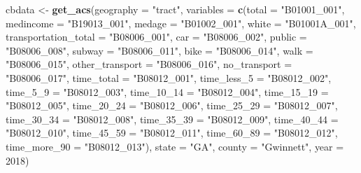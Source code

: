 \documentclass[
]{article}
\newenvironment{Shaded}{\begin{snugshade}}{\end{snugshade}}
\newcommand{\DataTypeTok}[1]{\textcolor[rgb]{0.13,0.29,0.53}{#1}}
\newcommand{\DecValTok}[1]{\textcolor[rgb]{0.00,0.00,0.81}{#1}}
\newcommand{\KeywordTok}[1]{\textcolor[rgb]{0.13,0.29,0.53}{\textbf{#1}}}
\newcommand{\NormalTok}[1]{#1}
\newcommand{\StringTok}[1]{\textcolor[rgb]{0.31,0.60,0.02}{#1}}
\begin{document}
\begin{Shaded}
\begin{Highlighting}[]
\NormalTok{cbdata <-}\StringTok{ }\KeywordTok{get_acs}\NormalTok{(}\DataTypeTok{geography =} \StringTok{"tract"}\NormalTok{,}
                  \DataTypeTok{variables =} \KeywordTok{c}\NormalTok{(}\DataTypeTok{total =} \StringTok{"B01001_001"}\NormalTok{,}
                                \DataTypeTok{medincome =} \StringTok{"B19013_001"}\NormalTok{,}
                                \DataTypeTok{medage =} \StringTok{"B01002_001"}\NormalTok{,}
                                \DataTypeTok{white =} \StringTok{"B01001A_001"}\NormalTok{,}
                                \DataTypeTok{transportation_total =} \StringTok{"B08006_001"}\NormalTok{,}
                                \DataTypeTok{car =} \StringTok{"B08006_002"}\NormalTok{,}
                                \DataTypeTok{public =} \StringTok{"B08006_008"}\NormalTok{,}
                                \DataTypeTok{subway =} \StringTok{"B08006_011"}\NormalTok{,}
                                \DataTypeTok{bike =} \StringTok{"B08006_014"}\NormalTok{,}
                                \DataTypeTok{walk =} \StringTok{"B08006_015"}\NormalTok{,}
                                \DataTypeTok{other_transport =} \StringTok{"B08006_016"}\NormalTok{,}
                                \DataTypeTok{no_transport =} \StringTok{"B08006_017"}\NormalTok{,}
                                \DataTypeTok{time_total =} \StringTok{"B08012_001"}\NormalTok{,}
                                \DataTypeTok{time_less_5 =} \StringTok{"B08012_002"}\NormalTok{,}
                                \DataTypeTok{time_5_9 =} \StringTok{"B08012_003"}\NormalTok{,}
                                \DataTypeTok{time_10_14 =} \StringTok{"B08012_004"}\NormalTok{,}
                                \DataTypeTok{time_15_19 =} \StringTok{"B08012_005"}\NormalTok{,}
                                \DataTypeTok{time_20_24 =} \StringTok{"B08012_006"}\NormalTok{,}
                                \DataTypeTok{time_25_29 =} \StringTok{"B08012_007"}\NormalTok{,}
                                \DataTypeTok{time_30_34 =} \StringTok{"B08012_008"}\NormalTok{,}
                                \DataTypeTok{time_35_39 =} \StringTok{"B08012_009"}\NormalTok{,}
                                \DataTypeTok{time_40_44 =} \StringTok{"B08012_010"}\NormalTok{,}
                                \DataTypeTok{time_45_59 =} \StringTok{"B08012_011"}\NormalTok{,}
                                \DataTypeTok{time_60_89 =} \StringTok{"B08012_012"}\NormalTok{,}
                                \DataTypeTok{time_more_90 =} \StringTok{"B08012_013"}\NormalTok{),}
                  \DataTypeTok{state =} \StringTok{"GA"}\NormalTok{,}
                  \DataTypeTok{county =} \StringTok{"Gwinnett"}\NormalTok{,}
                  \DataTypeTok{year =} \DecValTok{2018}\NormalTok{)}
\end{Highlighting}
\end{Shaded}
\end{document}
